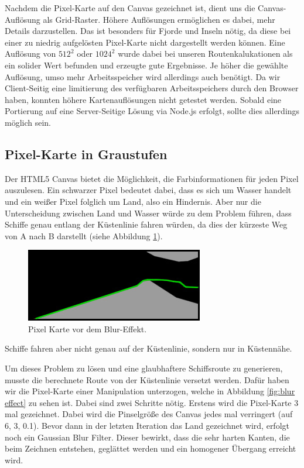 \documentclass[letterpaper]{article}
\begin{document}
	Nachdem die Pixel-Karte auf den Canvas gezeichnet ist, dient uns die Canvas-Auflösung als Grid-Raster. Höhere Auflösungen ermöglichen es dabei, mehr Details darzustellen. Das ist besonders für Fjorde und Inseln nötig, da diese bei einer zu niedrig aufgelösten Pixel-Karte nicht dargestellt werden können. Eine Auflösung von $512^2$ oder $1024^2$ wurde dabei bei unseren Routenkalukationen als ein solider Wert befunden und erzeugte gute Ergebnisse. Je höher die gewählte Auflösung, umso mehr Arbeitsspeicher wird allerdings auch benötigt. Da wir Client-Seitig eine limitierung des verfügbaren Arbeitsspeichers durch den Browser haben, konnten höhere Kartenauflösungen nicht getestet werden. Sobald eine Portierung auf eine Server-Seitige Lösung via Node.js erfolgt, sollte dies allerdings möglich sein.

	\subsection{Pixel-Karte in Graustufen}
		Der HTML5 Canvas bietet die Möglichkeit, die Farbinformationen für jeden Pixel auszulesen. Ein schwarzer Pixel bedeutet dabei, dass es sich um Wasser handelt und ein weißer Pixel folglich um Land, also ein Hindernis. Aber nur die Unterscheidung zwischen Land und Wasser würde zu dem Problem führen, dass Schiffe genau entlang der Küstenlinie fahren würden, da dies der kürzeste Weg von A nach B darstellt (siehe Abbildung \ref{fig:route before blur}).

		\begin{figure}[!htbp]
			\centering
			\includegraphics[width=.8\linewidth]{route_before_blur}
			\caption[]{Pixel Karte vor dem Blur-Effekt.\footnotemark}
			\label{fig:route before blur}
		\end{figure}

		Schiffe fahren aber nicht genau auf der Küstenlinie, sondern nur in Küstennähe.

		Um dieses Problem zu lösen und eine glaubhaftere Schiffsroute zu generieren, musste die berechnete Route von der Küstenlinie versetzt werden. Dafür haben wir die Pixel-Karte einer Manipulation unterzogen, welche in Abbildung \ref{fig:blur effect} zu sehen ist. Dabei sind zwei Schritte nötig. Erstens wird die Pixel-Karte 3 mal gezeichnet. Dabei wird die Pinselgröße des Canvas jedes mal verringert (auf 6, 3, 0.1). Bevor dann in der letzten Iteration das Land gezeichnet wird, erfolgt noch ein Gaussian Blur Filter\cite{vigour17}. Dieser bewirkt, dass die sehr harten Kanten, die beim Zeichnen entstehen, geglättet werden und ein homogener Übergang erreicht wird.
\end{document}
